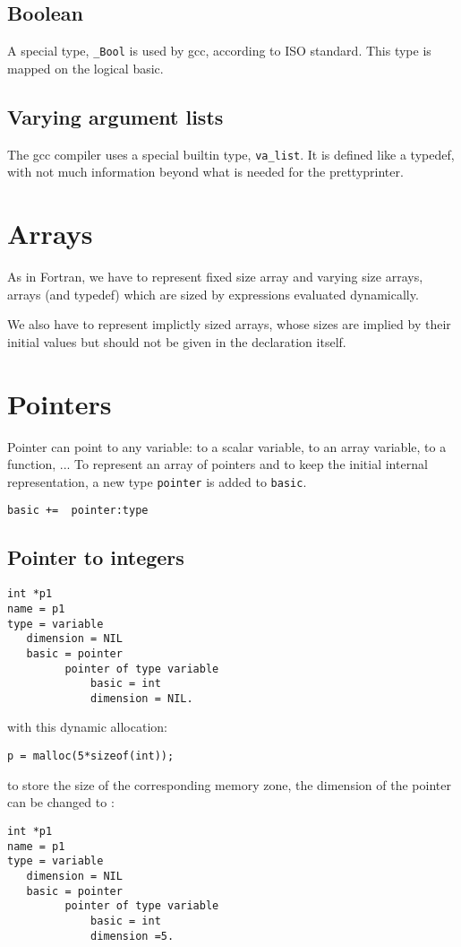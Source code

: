\documentclass[a4paper]{report}
\begin{document}
\subsection{Boolean}

A special type, \verb/_Bool/ is used by gcc, according to ISO
 standard. This type is mapped on the logical basic.

\subsection{Varying argument lists}

The gcc compiler uses a special builtin type, \verb/va_list/. It is
 defined like a typedef, with not much information beyond what is
 needed for the prettyprinter.

\section{Arrays}

As in Fortran, we have to represent fixed size array and varying size
 arrays, arrays (and typedef) which are sized by expressions evaluated
 dynamically.

We also have to represent implictly sized arrays, whose sizes are
 implied by their initial values but should not be given in the
 declaration itself.

\section{Pointers}

Pointer can point to any variable: to a scalar variable, to an array variable, to a function, ...
To represent an array of pointers and to keep the initial internal representation, a new type \verb/pointer/ is
added to \verb/basic/.   

\verb/basic +=  pointer:type/

\subsection{Pointer to integers}

\begin{verbatim}
int *p1
name = p1
type = variable
   dimension = NIL
   basic = pointer
         pointer of type variable
             basic = int
             dimension = NIL.
\end{verbatim}
with this dynamic allocation:
\begin{lstlisting}
p = malloc(5*sizeof(int));
\end{lstlisting}
to store the size of the corresponding memory zone, the dimension of the
pointer can be changed to : 
\begin{verbatim}
int *p1
name = p1
type = variable
   dimension = NIL
   basic = pointer
         pointer of type variable
             basic = int
             dimension =5.
\end{verbatim}
\end{document}
